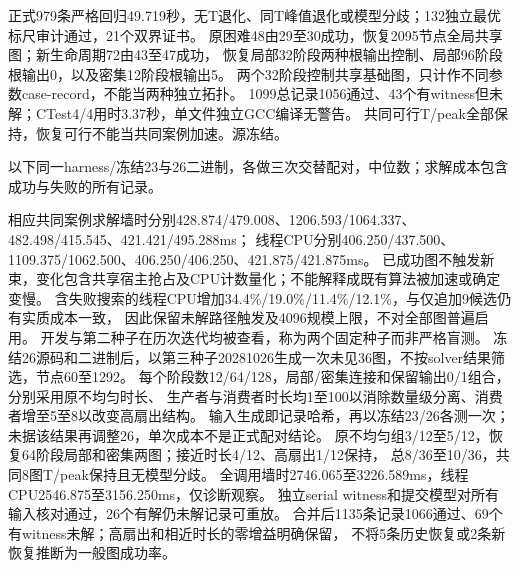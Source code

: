 \documentclass[UTF8,a4paper,11pt,fontset=fandol]{ctexart}
\begin{document}
正式979条严格回归49.719秒，无T退化、同T峰值退化或模型分歧；132独立最优标尺审计通过，21个双界证书。
原困难48由29至30成功，恢复2095节点全局共享图；新生命周期72由43至47成功，
恢复局部32阶段两种根输出控制、局部96阶段根输出0，以及密集12阶段根输出5。
两个32阶段控制共享基础图，只计作不同参数case-record，不能当两种独立拓扑。
1099总记录1056通过、43个有witness但未解；CTest4/4用时3.37秒，单文件独立GCC编译无警告。
共同可行T/peak全部保持，恢复可行不能当共同案例加速。源冻结。

以下同一harness/冻结23与26二进制，各做三次交替配对，中位数；求解成本包含成功与失败的所有记录。
\par\smallskip{}\par\smallskip

相应共同案例求解墙时分别428.874/\allowbreak{}479.008、1206.593/\allowbreak{}1064.337、482.498/\allowbreak{}415.545、421.421/\allowbreak{}495.288ms；
线程CPU分别406.250/\allowbreak{}437.500、1109.375/\allowbreak{}1062.500、406.250/\allowbreak{}406.250、421.875/\allowbreak{}421.875ms。
已成功图不触发新束，变化包含共享宿主抢占及CPU计数量化；不能解释成既有算法被加速或确定变慢。
含失败搜索的线程CPU增加34.4\%/19.0\%/11.4\%/12.1\%，与仅追加9候选仍有实质成本一致，
因此保留未解路径触发及4096规模上限，不对全部图普遍启用。
开发与第二种子在历次迭代均被查看，称为两个固定种子而非严格盲测。
冻结26源码和二进制后，以第三种子20281026生成一次未见36图，不按solver结果筛选，节点60至1292。
每个阶段数12/64/128，局部/密集连接和保留输出0/1组合，分别采用原不均匀时长、
生产者与消费者时长均1至100以消除数量级分离、消费者增至5至8以改变高扇出结构。
输入生成即记录哈希，再以冻结23/26各测一次；未据该结果再调整26，单次成本不是正式配对结论。
原不均匀组3/12至5/12，恢复64阶段局部和密集两图；接近时长4/12、高扇出1/12保持，
总8/36至10/36，共同8图T/peak保持且无模型分歧。
全调用墙时2746.065至3226.589ms，线程CPU2546.875至3156.250ms，仅诊断观察。
独立serial witness和提交模型对所有输入核对通过，26个有解仍未解记录可重放。
合并后1135条记录1066通过、69个有witness未解；高扇出和相近时长的零增益明确保留，
不将5条历史恢复或2条新恢复推断为一般图成功率。
\end{document}
